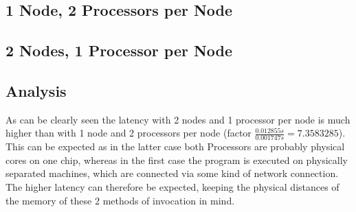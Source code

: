 \documentclass[10pt,a4paper]{article}
\begin{document}
\subsection{1 Node, 2 Processors per Node}


\subsection{2 Nodes, 1 Processor per Node}


\subsection{Analysis}
As can be clearly seen the latency with 2 nodes and 1 processor per node is much higher than with 1 node and 2 processors per node (factor $\frac{0.012855s}{0.001747s}=7.3583285$).\\
This can be expected as in the latter case both Processors are probably physical cores on one chip, whereas in the first case the program is executed on physically separated machines, which are connected via some kind of network connection. The higher latency can therefore be expected, keeping the physical distances of the memory of these 2 methods of invocation in mind.
\end{document}
